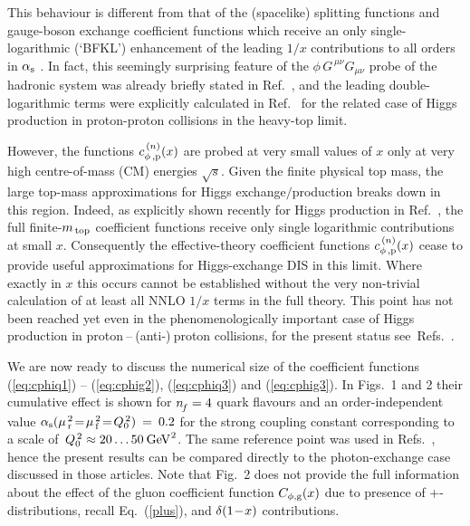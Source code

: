 \documentclass[12pt]{article}
\newcommand{\as}{\alpha_{\rm s}}
\begin{document}
This behaviour is different from that of the (spacelike) splitting functions 
and gauge-boson exchange coefficient functions which receive an only 
single-logarithmic (`BFKL') enhancement of the leading $1/x$ contributions to 
all orders in $\as$ \cite{BFKL,Catani:1990eg,Catani:1994sq}. In fact, this
seemingly surprising feature of the $\phi\, G^{\,\mu\nu} G_{\mu\nu}$ probe of
the hadronic system was already briefly stated in Ref.~\cite{Catani:1990eg},
and the leading double-logarithmic terms were explicitly calculated in 
Ref.~\cite{Hautmann:2002tu} for the related case of Higgs production in 
proton-proton collisions in the heavy-top limit.
 
However, the functions $c^{\,(n)}_{\rm \phi\, , p}(x)$ are probed at very 
small values of $x$ only at very high centre-of-mass (CM) energies $\sqrt{s}$.
Given the finite physical top mass, the large top-mass approximations for Higgs
exchange$/$production breaks down in this region. Indeed, as explicitly shown 
recently for Higgs production in Ref.~\cite{Marzani:2008az}, the full 
finite-$m_{\,\rm top}$ coefficient functions receive only single logarithmic 
contributions at small $x$. Consequently the effective-theory coefficient 
functions $c^{\,(n)}_{\rm \phi\, , p}(x)$ cease to provide useful 
approximations for Higgs-exchange DIS in this limit. Where exactly in $x$ this 
occurs cannot be established without the very non-trivial calculation of at 
least all NNLO $1/x$ terms in the full theory. This point has not been reached 
yet even in the phenomenologically important case of Higgs production in 
proton$\:\!$--$\:\!$(anti-)$\:\!$proton collisions, for the present status 
see~Refs.~\cite{Harlander:2009mq}.

We are now ready to discuss the numerical size of the coefficient functions
(\ref{eq:cphiq1}) -- (\ref{eq:cphig2}), (\ref{eq:cphiq3}) and (\ref{eq:cphig3}).
In Figs.~1 and 2 their cumulative effect is shown for ${n^{}_{\! f}} = 4$ quark flavours
and an order-independent value $\as (\mu_{\,\rm r}^{\,2}\!=\! 
\mu_{\,\rm f}^{\,2}\!=\! Q_0^{\,2})\:=\: 0.2$ for the strong coupling constant 
corresponding to a scale of $\,Q_0^{\,2} \approx 20 \ldots 50\:\GeV2$. The same
reference point was used in Refs.~\cite{MVV5,MVV6}, hence the present results
can be compared directly to the photon-exchange case discussed in those 
articles. Note that Fig.~2 does not provide the full information about the
effect of the gluon coefficient function $C_{\rm \phi, g}(x)$ due to presence
of +-distributions, recall Eq.~(\ref{plus}), and $\delta \x1$ contributions.
\end{document}

